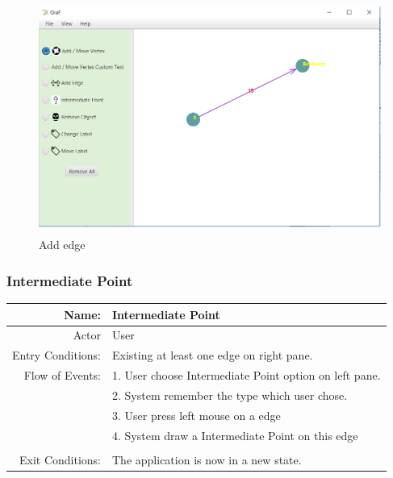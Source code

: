 \documentclass[a4paper,10pt]{article}
\begin{document}
\paragraph{}

\begin{figure}[H]
		\centering
		\includegraphics[height = 3in]{addEdge2.png}
		\caption[Optional caption]{Add edge}
		\label{fig:Repository}
	\end{figure}
\paragraph{}

\subsubsection{Intermediate Point}
	\begin{tabular}{|r|l|}
\hline
Name: & Intermediate Point \\
\hline
Actor & User \\
\hline
Entry Conditions: & Existing at least one edge on right pane. \\
\hline
Flow of Events: & 1. User choose Intermediate Point option on left pane. \\
& 2. System remember the type which user chose.  \\
& 3. User press left mouse on a edge  \\
& 4. System draw a Intermediate Point on this edge  \\
\\
\hline
Exit Conditions: & The application is now in a new state. \\
\hline

\end{tabular}
	\paragraph{}
	
\end{document}
